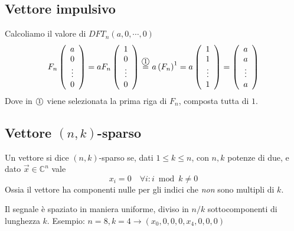\subsection{Vettore impulsivo}
Calcoliamo il valore di $DFT_n \left( a, 0, \cdots, 0 \right)$
\begin{equation*}
    F_n
    \left( 
        \begin{array}[h]{c}
            a \\ 0 \\ \vdots \\ 0
        \end{array}
    \right)
    =
    a F_n
    \left( 
        \begin{array}[h]{c}
            1 \\ 0 \\ \vdots \\ 0
        \end{array}
    \right)
    \overset{\circola{1}}{=}
    a \left( F_n \right)^1
    =
    a
    \left( 
        \begin{array}[h]{c}
            1 \\ 1 \\ \vdots \\ 1
        \end{array}
    \right)
    =
    \left( 
        \begin{array}[h]{c}
            a \\ a \\ \vdots \\ a
        \end{array}
    \right)
\end{equation*}
Dove in $\mbox{\textcircled{\footnotesize 1}}$ viene selezionata la prima riga di $F_n$, composta tutta di $1$.

\subsection{Vettore $(n,k)$-sparso}
\begin{definition}
    Un vettore si dice $(n,k)$-sparso se, dati $1 \leq k \leq n$, con $n,k$ potenze di due, e dato $\vec{x} \in \mathbb{C}^n$ vale
    \begin{equation*}
        x_i = 0 \quad \forall i : i \bmod k \neq 0
    \end{equation*}
    Ossia il vettore ha componenti nulle per gli indici che \emph{non} sono multipli di $k$.
    \label{def:nksparso}
\end{definition}
Il segnale è spaziato in maniera uniforme, diviso in $n/k$ sottocomponenti di lunghezza $k$.
Esempio: $n=8, k=4 \rightarrow \left( x_0,0,0,0,x_4,0,0,0 \right)$

